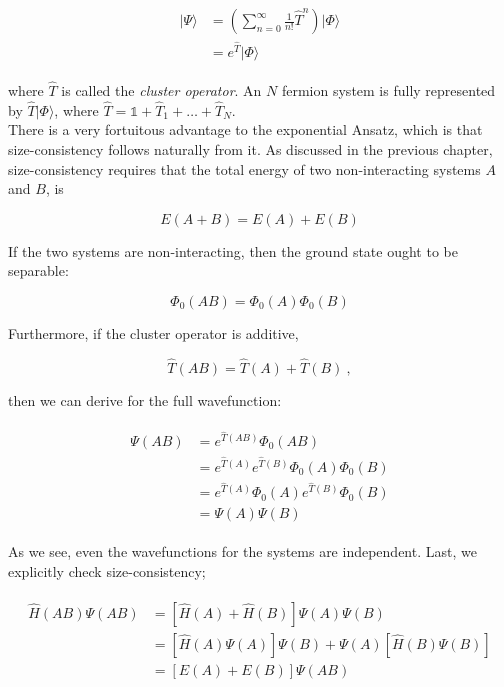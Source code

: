 	\begin{align}
		\begin{split}
		|\Psi\rangle &= \left(\sum_{n=0}^\infty \frac{1}{n!}\hat{T}^n\right)|\Phi\rangle\\
		&= e^{\hat{T}}|\Phi\rangle
		\end{split}
	\end{align}
	
	\noindent where $\hat{T}$ is called the \emph{cluster operator}. An $N$ fermion system is fully represented by $\hat{T}|\Phi\rangle$, where $\hat{T} = \mathds{1} + \hat{T}_1 +\ldots+\hat{T}_N$.\\
	
	There is a very fortuitous advantage to the exponential Ansatz, which is that size-consistency follows naturally from it. As discussed in the previous chapter, size-consistency requires that the total energy of two non-interacting systems $A$ and $B$, is
	
	\begin{equation}
		E(A+B) = E(A) + E(B)
	\end{equation}
	
	If the two systems are non-interacting, then the ground state ought to be separable:
	
	\begin{equation}
		\Phi_0(AB) = \Phi_0(A)\Phi_0(B)
	\end{equation}
	
	Furthermore, if the cluster operator is additive,
	
	\begin{equation}
		\hat{T}(AB) = \hat{T}(A) + \hat{T}(B)\:,
	\end{equation}
	
	\noindent then we can derive for the full wavefunction:
	
	\begin{align}
		\begin{split}
			\Psi(AB) &= e^{\hat{T}(AB)}\Phi_0(AB) \\
			&= e^{\hat{T}(A)}e^{\hat{T}(B)}\Phi_0(A)\Phi_0(B) \\
			&= e^{\hat{T}(A)}\Phi_0(A)e^{\hat{T}(B)}\Phi_0(B) \\
			&= \Psi(A)\Psi(B) 
		\end{split}
	\end{align}
	
	As we see, even the wavefunctions for the systems are independent. Last, we explicitly check size-consistency;
	
	\begin{align}
		\begin{split}
			\hat{H}(AB)\Psi(AB) &= \left[ \hat{H}(A) + \hat{H}(B) \right]\Psi(A)\Psi(B) \\
			&= \left[ \hat{H}(A)\Psi(A)\right]\Psi(B) + \Psi(A)\left[\hat{H}(B)\Psi(B)\right] \\
			&= \left[E(A) + E(B)\right]\Psi(AB)
		\end{split}
	\end{align}
	
